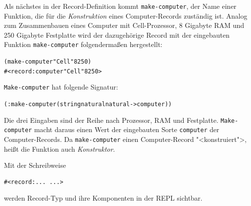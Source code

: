 Als nächstes in der Record-Definition kommt \texttt{make-computer},
der Name einer Funktion, die für die \textit{Konstruktion} eines
Computer-Records zuständig ist.  Analog zum Zusammenbauen eines
Computer mit Cell-Prozessor, 8 Gigabyte RAM und 250 Gigabyte
Festplatte wird der dazugehörige Record mit der eingebauten Funktion
\texttt{make-computer} folgendermaßen hergestellt:
%
\begin{alltt}
(make-computer "Cell" 8 250)
\evalsto{} #<record:computer "Cell" 8 250>
\end{alltt}
%
\texttt{Make-computer} hat folgende Signatur:
%
\begin{alltt}
(: make-computer (string natural natural -> computer))
\end{alltt}
%
Die drei Eingaben sind der Reihe nach Prozessor, RAM und Festplatte.
\texttt{Make-computer} macht daraus einen Wert der eingebauten Sorte
\texttt{computer} der Computer-Records.  Da \texttt{make-computer}
einen Computer-Record "<konstruiert">, heißt die Funktion auch
\textit{Konstruktor}.

Mit der Schreibweise
%
\begin{verbatim}
#<record:... ...>
\end{verbatim}
%
werden Record-Typ und ihre Komponenten in der REPL sichtbar.

